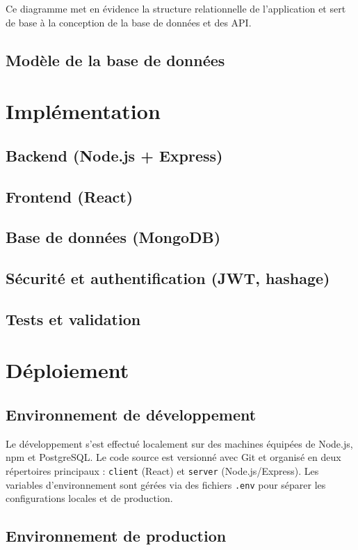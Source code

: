 \documentclass[12pt,a4paper]{report}
\begin{document}
Ce diagramme met en évidence la structure relationnelle de l’application et sert de base à la conception de la base de données et des API.
\section{Modèle de la base de données}

\chapter{Implémentation}
\section{Backend (Node.js + Express)}
\section{Frontend (React)}
\section{Base de données (MongoDB)}
\section{Sécurité et authentification (JWT, hashage)}
\section{Tests et validation}

\chapter{Déploiement}
\section{Environnement de développement}

Le développement s’est effectué localement sur des machines équipées de Node.js, npm et PostgreSQL. Le code source est versionné avec Git et organisé en deux répertoires principaux : \texttt{client} (React) et \texttt{server} (Node.js/Express). Les variables d’environnement sont gérées via des fichiers \texttt{.env} pour séparer les configurations locales et de production.

\section{Environnement de production}
\end{document}
